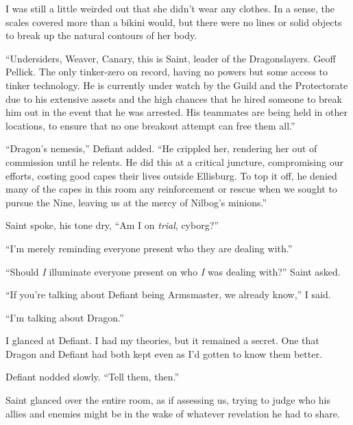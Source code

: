 I was still a little weirded out that she didn't wear any clothes.  In a sense, the scales covered more than a bikini would, but there were no lines or solid objects to break up the natural contours of her body.



``Undersiders, Weaver, Canary, this is Saint, leader of the Dragonslayers.  Geoff Pellick.  The only tinker-zero on record, having no powers but some access to tinker technology.  He is currently under watch by the Guild and the Protectorate due to his extensive assets and the high chances that he hired someone to break him out in the event that he was arrested.  His teammates are being held in other locations, to ensure that no one breakout attempt can free them all.''



``Dragon's nemesis,'' Defiant added.  ``He crippled her, rendering her out of commission until he relents.  He did this at a critical juncture, compromising our efforts, costing good capes their lives outside Ellisburg.  To top it off, he denied many of the capes in this room any reinforcement or rescue when we sought to pursue the Nine, leaving us at the mercy of Nilbog's minions.''



Saint spoke, his tone dry, ``Am I on \emph{trial}, cyborg?''



``I'm merely reminding everyone present who they are dealing with.''



``Should \emph{I} illuminate everyone present on who \emph{I} was dealing with?'' Saint asked.



``If you're talking about Defiant being Armsmaster, we already know,'' I said.



``I'm talking about Dragon.''



I glanced at Defiant.  I had my theories, but it remained a secret.  One that Dragon and Defiant had both kept even as I'd gotten to know them better.



Defiant nodded slowly.  ``Tell them, then.''



Saint glanced over the entire room, as if assessing us, trying to judge who his allies and enemies might be in the wake of whatever revelation he had to share.



